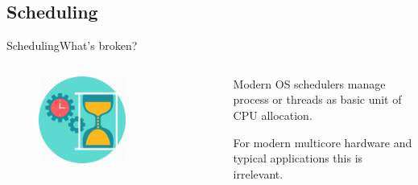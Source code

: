 \documentclass[10pt]{beamer}
\begin{document}
\subsection{Scheduling}
\begin{frame}{Scheduling}{What's broken?}
  \begin{columns}[T]
    \begin{column}{.2\textwidth}
      \begin{figure}[ht]
        \centering
        \includegraphics[width=0.6\textwidth, keepaspectratio=true]{images/scheduler.png}
      \end{figure}
    \end{column}

    \hfill
    \begin{column}{.8\textwidth}
      \begin{block}{}
        Modern OS schedulers manage process or threads as basic unit of CPU
        allocation. 
      \end{block} \pause

      \begin{block}{}
        For modern multicore hardware and typical applications this is irrelevant.
      \end{block}
      \end{column}
    \end{columns}
\end{frame}
\end{document}
